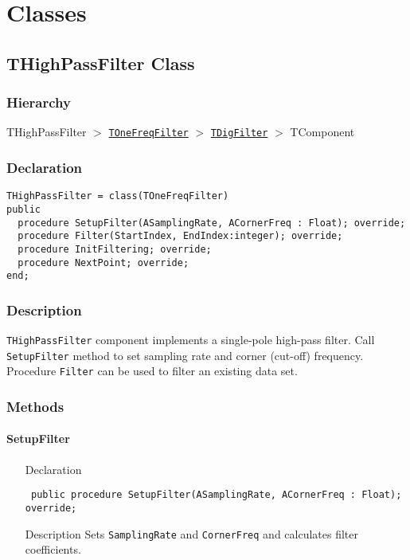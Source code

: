 \documentclass[12pt,a4paper,oneside]{report}
\newcommand{\declarationitem}[1]{{\addfontfeatures{FakeSlant} #1}}
\newcommand{\descriptiontitle}[1]{{\addfontfeatures{FakeSlant}#1}}
\newcommand{\code}[1]{\texttt{#1}}
\begin{document}
\section{Classes}
\subsection{THighPassFilter Class}
\label{lmRecursFilters.THighPassFilter}
\subsubsection{Hierarchy}
THighPassFilter {$>$} \hyperref[lmfilters.TOneFreqFilter]{\code{TOneFreqFilter}} {$>$} \hyperref[lmfilters.TDigFilter]{\code{TDigFilter}} {$>$} TComponent
\subsubsection{Declaration}
\begin{verbatim}
THighPassFilter = class(TOneFreqFilter)
public
  procedure SetupFilter(ASamplingRate, ACornerFreq : Float); override;
  procedure Filter(StartIndex, EndIndex:integer); override;
  procedure InitFiltering; override;
  procedure NextPoint; override;
end;
\end{verbatim}
\subsubsection{Description}
\code{THighPassFilter} component implements a single-pole high-pass filter. Call \code{SetupFilter} method to set sampling rate and corner (cut-off) frequency. Procedure \code{Filter} can be used to filter an existing data set.
\subsubsection{Methods}
\paragraph{SetupFilter}
\label{lmRecursFilters.THighPassFilter-SetupFilter}
\begin{itemize}\item[\declarationitem{Declaration}\hfill]
	\begin{flushleft}
	\code{	public procedure SetupFilter(ASamplingRate, ACornerFreq : Float); override;}		
	\end{flushleft}
	\item[\descriptiontitle{Description}\hfill] Sets \code{SamplingRate} and \code{CornerFreq} and calculates filter coefficients. 
\end{itemize}
\end{document}
